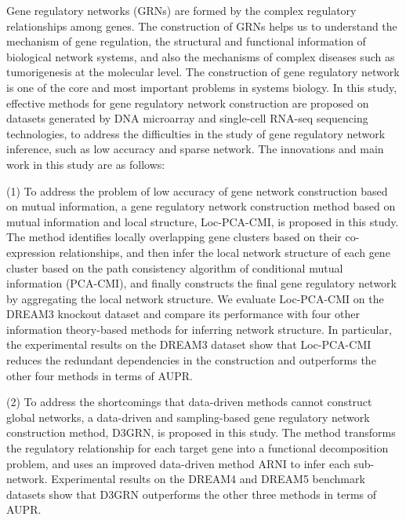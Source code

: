 \begin{abstracten}\setlength{\baselineskip}{20pt}


Gene regulatory networks (GRNs) are formed by the complex regulatory relationships among genes. 
The construction of GRNs helps us to understand the mechanism of gene regulation, the structural and functional information of biological network systems, and also the mechanisms of complex diseases such as tumorigenesis at the molecular level.
The construction of gene regulatory network is one of the core and most important problems in systems biology.
In this study, effective methods for gene regulatory network construction are proposed on datasets generated by  DNA microarray and single-cell  RNA-seq  sequencing technologies, 
to address  the difficulties in the study of gene regulatory network inference, such as low accuracy and sparse network.
The innovations and main work in this study are as follows:

(1) To address the problem of low accuracy of gene network construction based on mutual information, 
a gene regulatory network construction method based on mutual information and local structure, Loc-PCA-CMI, is proposed in this study. 
The method identifies locally overlapping gene clusters based on their co-expression relationships, and then infer the local network structure of each gene cluster based on the path consistency algorithm of conditional mutual information (PCA-CMI), 
and finally constructs the final gene regulatory network by aggregating the local network structure.
We evaluate Loc-PCA-CMI on the DREAM3 knockout dataset and compare its performance with four other information theory-based methods for inferring network structure.
In particular, the experimental results on the DREAM3 dataset show that Loc-PCA-CMI  reduces the redundant dependencies 
in the construction  and outperforms the other four  methods in terms of AUPR.

(2) To address the shortcomings that data-driven methods cannot construct global networks, 
a data-driven and sampling-based gene regulatory network construction method, D3GRN, 
is proposed in this study. 
The method transforms the regulatory relationship for each target gene into a functional decomposition problem, 
and uses an improved data-driven method ARNI to infer each sub-network.
Experimental results on the DREAM4 and DREAM5 benchmark datasets show that D3GRN outperforms the other three methods in terms of AUPR.



\end{abstracten}
